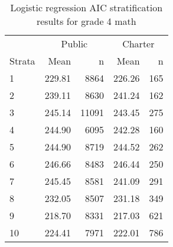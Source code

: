 \begin{table}[ht]
\centering
\caption{Logistic regression AIC stratification results for grade 4 math} 
\label{g4math-circpsa10AIC}
\begin{tabular}{lrr@{\extracolsep{.2cm}}rr}
  \hline
   & \multicolumn{2}{c}{Public} & \multicolumn{2}{c}{Charter} \\ \cline{2-3} \cline{4-5} Strata & Mean & n & Mean & n \\ \hline
1 & 229.81 & 8864 & 226.26 & 165 \\ 
  2 & 239.11 & 8630 & 241.24 & 162 \\ 
  3 & 245.14 & 11091 & 243.45 & 275 \\ 
  4 & 244.90 & 6095 & 242.28 & 160 \\ 
  5 & 244.90 & 8719 & 244.52 & 262 \\ 
  6 & 246.66 & 8483 & 246.44 & 250 \\ 
  7 & 245.45 & 8581 & 241.09 & 291 \\ 
  8 & 232.05 & 8507 & 231.18 & 349 \\ 
  9 & 218.70 & 8331 & 217.03 & 621 \\ 
  10 & 224.41 & 7971 & 222.01 & 786 \\ 
   \hline
\end{tabular}
\end{table}

